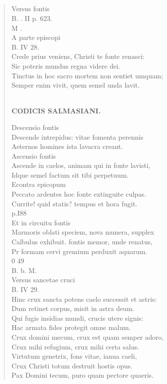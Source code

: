 \documentclass[11pt, a4paper]{report}
\begin{document}
            \subsection*{}
      \begin{verse}
      Versus fontis \\ B. . II p. 623. \\ M . \\ A parte episcopi \\ B. IV 28. \\ Crede prius veniens, Christi te fonte renasci: \\ Sic poteris mundus regna videre dei. \\ Tinctus in hoc sacro mortem non sentiet umquam; \\ Semper enim vivit, quem semel unda lavit. \\ 
        ﻿\pagebreak 
    \begin{center} \textbf{CODICIS SALMASIANI.} \end{center} \marginpar{[291]} Descensio fontis \\ Descende intrepidus: vitae fomenta perennis \\ Aeternos homines ista lavacra creant. \\ Ascensio fontis \\ Ascende in caelos, animam qui in fonte lavisti, \\ Idque semel factum sit tibi perpetuum. \\ Econtra epicopum \\ Peccato ardentes hoc fonte extinguite culpas. \\ Currite! quid statis? tempus et hora fugit. \\ p.I88 \\ Et in circuitu fontis \\ Marmoris oblati speciem, nova munera, supplex \\ Calbulus exhibuit. fontis memor, unde renatus, \\ Pr formam cervi gremium perduxit aquarum. \\ 0 49 \\ B. b. M. \\ Versus sancetae cruci \\ B. IV 29. \\ Hinc crux sancta potens caelo successit et astris: \\ Dum retinet corpus, misit in astra deum. \\ Qui fugis insidias mundi, crucis utere signis: \\ Hac armata fides protegit omne malum. \\ Crux domini mecum, crux est quam semper adoro, \\ Crux mihi refugium, crux mihi certa salus. \\ Virtutum genetrix, fons vitae, ianua caeli, \\ Crux Christi totum destruit hostis opus. \\ Pax Domini tecum, puro quam pectore quaeris. \\ 

\end{verse}
\end{document}
